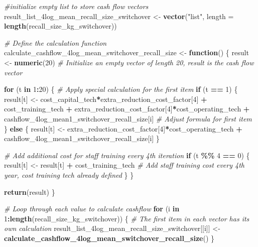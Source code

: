 \documentclass[
]{article}
\newenvironment{Shaded}{\begin{snugshade}}{\end{snugshade}}
\newcommand{\AttributeTok}[1]{\textcolor[rgb]{0.13,0.29,0.53}{#1}}
\newcommand{\CommentTok}[1]{\textcolor[rgb]{0.56,0.35,0.01}{\textit{#1}}}
\newcommand{\ControlFlowTok}[1]{\textcolor[rgb]{0.13,0.29,0.53}{\textbf{#1}}}
\newcommand{\DecValTok}[1]{\textcolor[rgb]{0.00,0.00,0.81}{#1}}
\newcommand{\FunctionTok}[1]{\textcolor[rgb]{0.13,0.29,0.53}{\textbf{#1}}}
\newcommand{\NormalTok}[1]{#1}
\newcommand{\OtherTok}[1]{\textcolor[rgb]{0.56,0.35,0.01}{#1}}
\newcommand{\SpecialCharTok}[1]{\textcolor[rgb]{0.81,0.36,0.00}{\textbf{#1}}}
\newcommand{\StringTok}[1]{\textcolor[rgb]{0.31,0.60,0.02}{#1}}
\begin{document}
\begin{Shaded}
\begin{Highlighting}[]
\CommentTok{\#initialize empty list to store cash flow vectors}
\NormalTok{result\_list\_4log\_mean\_recall\_size\_switchover }\OtherTok{\textless{}{-}} \FunctionTok{vector}\NormalTok{(}\StringTok{"list"}\NormalTok{, }\AttributeTok{length =} \FunctionTok{length}\NormalTok{(recall\_size\_kg\_switchover))}


\CommentTok{\# Define the calculation function}
\NormalTok{calculate\_cashflow\_4log\_mean\_switchover\_recall\_size }\OtherTok{\textless{}{-}} \ControlFlowTok{function}\NormalTok{() \{}
\NormalTok{  result }\OtherTok{\textless{}{-}} \FunctionTok{numeric}\NormalTok{(}\DecValTok{20}\NormalTok{)  }\CommentTok{\# Initialize an empty vector of length 20, result is the cash flow vector}
  
  \ControlFlowTok{for}\NormalTok{ (t }\ControlFlowTok{in} \DecValTok{1}\SpecialCharTok{:}\DecValTok{20}\NormalTok{) \{}
    \CommentTok{\# Apply special calculation for the first item}
    \ControlFlowTok{if}\NormalTok{ (t }\SpecialCharTok{==} \DecValTok{1}\NormalTok{) \{}
\NormalTok{      result[t] }\OtherTok{\textless{}{-}}\NormalTok{ cost\_capital\_tech}\SpecialCharTok{*}\NormalTok{extra\_reduction\_cost\_factor[}\DecValTok{4}\NormalTok{] }\SpecialCharTok{+}\NormalTok{ cost\_training\_tech }\SpecialCharTok{+}\NormalTok{ extra\_reduction\_cost\_factor[}\DecValTok{4}\NormalTok{]}\SpecialCharTok{*}\NormalTok{cost\_operating\_tech }\SpecialCharTok{+}\NormalTok{ cashflow\_4log\_mean1\_switchover\_recall\_size[i] }\CommentTok{\# Adjust formula for first item}
\NormalTok{    \} }\ControlFlowTok{else}\NormalTok{ \{}
\NormalTok{      result[t] }\OtherTok{\textless{}{-}}\NormalTok{ extra\_reduction\_cost\_factor[}\DecValTok{4}\NormalTok{]}\SpecialCharTok{*}\NormalTok{cost\_operating\_tech }\SpecialCharTok{+}\NormalTok{ cashflow\_4log\_mean1\_switchover\_recall\_size[i]}
\NormalTok{    \}}
    
    \CommentTok{\# Add additional cost for staff training every 4th iteration}
    \ControlFlowTok{if}\NormalTok{ (t }\SpecialCharTok{\%\%} \DecValTok{4} \SpecialCharTok{==} \DecValTok{0}\NormalTok{) \{}
\NormalTok{      result[t] }\OtherTok{\textless{}{-}}\NormalTok{ result[t] }\SpecialCharTok{+}\NormalTok{ cost\_training\_tech  }\CommentTok{\# Add staff training cost every 4th year, cost training tech already defined}
\NormalTok{    \}}
\NormalTok{  \}}
  
  \FunctionTok{return}\NormalTok{(result)}
\NormalTok{\}}

\CommentTok{\# Loop through each value to calculate cashflow}
\ControlFlowTok{for}\NormalTok{ (i }\ControlFlowTok{in} \DecValTok{1}\SpecialCharTok{:}\FunctionTok{length}\NormalTok{(recall\_size\_kg\_switchover)) \{}
  \CommentTok{\# The first item in each vector has its own calculation}
\NormalTok{  result\_list\_4log\_mean\_recall\_size\_switchover[[i]] }\OtherTok{\textless{}{-}} \FunctionTok{calculate\_cashflow\_4log\_mean\_switchover\_recall\_size}\NormalTok{()}
\NormalTok{\}}



\end{Highlighting}
\end{Shaded}
\end{document}
